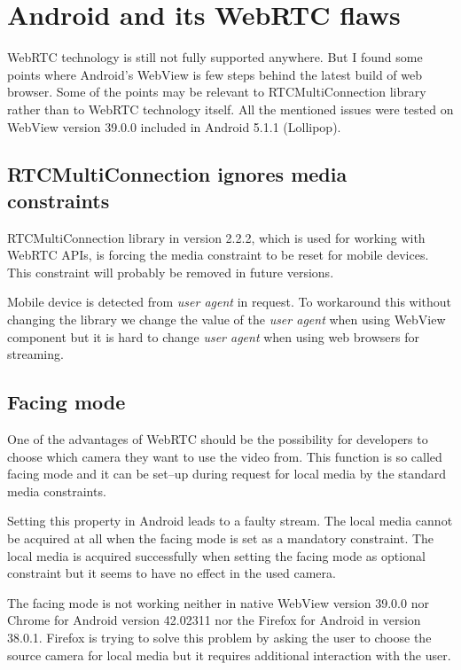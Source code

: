 \section{Android and its WebRTC flaws}
WebRTC technology is still not fully supported anywhere. But I found some points where Android's WebView is few steps behind the latest build of web browser. Some of the points may be relevant to RTCMultiConnection library rather than to WebRTC technology itself. All the mentioned issues were tested on WebView version 39.0.0 included in Android 5.1.1 (Lollipop).

\subsection{RTCMultiConnection ignores media constraints}
RTCMultiConnection library in version 2.2.2, which is used for working with WebRTC APIs, is forcing the media constraint to be reset for mobile devices. This constraint will probably be removed in future versions.

Mobile device is detected from \textit{user agent} in request.  To workaround this without changing the library we change the value of the \textit{user agent} when using WebView component but it is hard to change \textit{user agent} when using web browsers for streaming.

\subsection{Facing mode}
One of the advantages of WebRTC should be the possibility for developers to choose which camera they want to use the video from. This function is so called facing mode and it can be set--up during request for local media by the standard media constraints.

Setting this property in Android leads to a faulty stream. The local media cannot be acquired at all when the facing mode is set as a mandatory constraint. The local media is acquired successfully when setting the facing mode as optional constraint but it seems to have no effect in the used camera.

The facing mode is not working neither in native WebView version 39.0.0  nor Chrome for Android version 42.02311 nor the Firefox for Android in version 38.0.1. Firefox is trying to solve this problem by asking the user to choose the source camera for local media but it requires additional interaction with the user.

